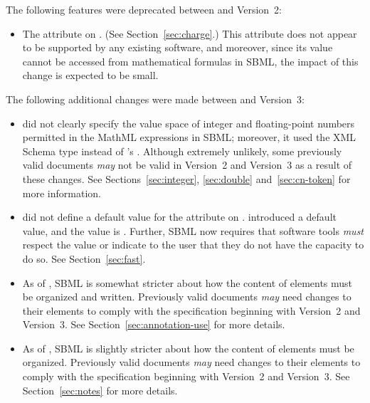 The following features were deprecated between \sbmltwoone and
Version~2:
\begin{itemize}
  
\item The  attribute on \Species.  (See
  Section~\ref{sec:charge}.)  This attribute does not appear to be
  supported by any existing software, and moreover, since its
  value cannot be accessed from mathematical formulas in SBML, the
  impact of this change is expected to be small.

\end{itemize}

The following additional changes were made between \sbmltwoone and
Version~3:
\begin{itemize}

\item \sbmltwoone did not clearly specify the value space of
  integer and floating-point numbers permitted in the MathML
  expressions in SBML; moreover, it used the XML Schema type
   instead of \sbmltwotwo's .  Although
  extremely unlikely, some previously valid \sbmltwoone documents
  \emph{may} not be valid in Version~2 and Version~3 as a result
  of these changes.  See Sections~\ref{sec:integer},
  \ref{sec:double} and~\ref{sec:cn-token} for more information.

\item \sbmltwoone did not define a default value for the attribute
   on \Reaction.  \sbmltwotwo introduced a default
  value, and the value is .  Further, SBML now requires
  that software tools \emph{must} respect the value or indicate to
  the user that they do not have the capacity to do so.  See
  Section~\ref{sec:fast}.
  
\item As of \sbmltwotwo, SBML is somewhat stricter about how the
  content of  elements must be organized and
  written.  Previously valid \sbmltwoone documents \emph{may}
  need changes to their  elements to comply with
  the specification beginning with Version~2 and Version~3.  See
  Section~\ref{sec:annotation-use} for more details.
  
\item As of \sbmltwotwo, SBML is slightly stricter about how the
  content of  elements must be organized.  Previously
  valid \sbmltwoone documents \emph{may} need changes to their
   elements to comply with the specification
  beginning with Version~2 and Version~3.  See
  Section~\ref{sec:notes} for more details.
  

\end{itemize}

